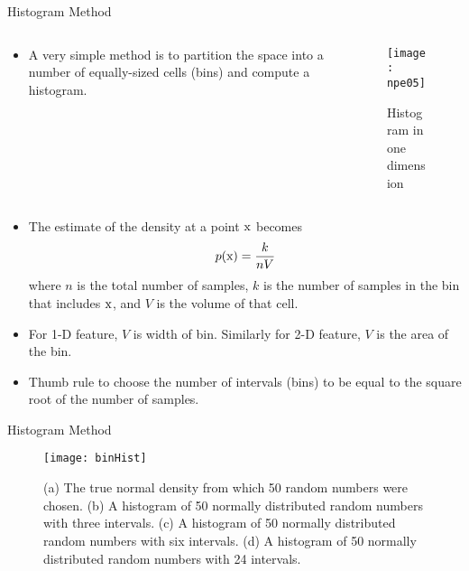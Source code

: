 \begin{frame}{Histogram Method}
\vspace{-0.5cm}
\begin{columns}
\begin{column}{5cm}
\begin{footnotesize}
\begin{itemize}
\item A very simple method is to
partition the space into a
number of equally-sized
cells (bins) and compute a
histogram.
\end{itemize}
\end{footnotesize}
\end{column}
\begin{column}{5cm}
\begin{figure}
\texttt{[image: npe05]}
\caption{Histogram in one dimension}
\end{figure}
\end{column}
\end{columns}
\begin{footnotesize}
\begin{itemize}
\item The estimate of the density at a point ${\rm x}$ becomes
\begin{equation}
p({\rm x})=\frac{k}{nV} \nonumber
\end{equation}
where $n$ is the total number of samples, $k$ is the number of samples in the bin that includes ${\rm x}$, and $V$ is the volume of that cell.
\item For 1-D feature, $V$ is width of bin. Similarly for 2-D feature, $V$ is the area of the bin.
\item Thumb rule to choose the number of intervals (bins) to be equal to the square root of the number of samples.
\end{itemize}
\end{footnotesize}
\end{frame}

\begin{frame}{Histogram Method}
\begin{figure}
\texttt{[image: binHist]}
\caption{{\scriptsize (a) The true normal density from which 50 random numbers were chosen. (b) A histogram of 50 normally distributed random numbers with three intervals.  (c) A histogram of 50 normally distributed random numbers with six intervals. (d) A histogram of 50 normally distributed random numbers with 24 intervals.}}
\end{figure}
\end{frame}

